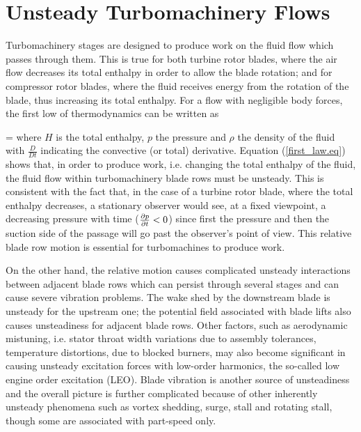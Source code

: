 %
%
%
%
\section{Unsteady Turbomachinery Flows}
\label{unsteady_flow_intro.sec}
%
 Turbomachinery stages are designed to produce work on the fluid flow
 which passes through them. This is true for both turbine rotor blades,
 where the air flow decreases its total enthalpy in order to allow the
 blade rotation; and for compressor rotor blades, where the fluid receives
 energy from the rotation of the blade, thus increasing its total enthalpy.
 For a flow with negligible body forces, the first low of thermodynamics
 can be written as

%
\beq
   = 
  \label{first_law.eq}
\eeq
%
 where $H$ is the total enthalpy, $p$ the pressure and $\rho$ the density
 of the fluid with $\frac{D}{D t}$ indicating the convective (or total)
 derivative.
 Equation (\ref{first_law.eq}) shows that, in order to produce work, i.e.
 changing the total enthalpy of the fluid, the fluid flow within
 turbomachinery blade rows must be unsteady. This is consistent with the
 fact that, in the case of a turbine rotor blade, where the total enthalpy
 decreases, a stationary observer would see, at a fixed viewpoint, a decreasing
 pressure with time ($\frac{\partial p}{\partial t} < 0$) since first the pressure and then
 the suction side of the passage will go past the observer's point of view.
 This relative blade row motion is essential for turbomachines
 to produce work.

 On the other hand, the relative motion causes complicated
 unsteady interactions between adjacent blade rows which can persist
 through several stages and can cause severe vibration problems.
 The wake shed by the downstream blade is unsteady for the upstream one;
 the potential field associated with blade lifts also causes unsteadiness
 for adjacent blade rows.
 Other factors, such as aerodynamic mistuning, i.e. stator throat width
 variations due to assembly tolerances, temperature distortions, due to
 blocked burners, may also become significant in causing unsteady excitation
 forces with low-order harmonics, the so-called low engine order excitation
 (LEO).
 Blade vibration is another source of unsteadiness
 and the overall picture is further complicated because of other inherently
 unsteady phenomena such as vortex shedding, surge, stall and rotating stall,
 though some are associated with part-speed only.

